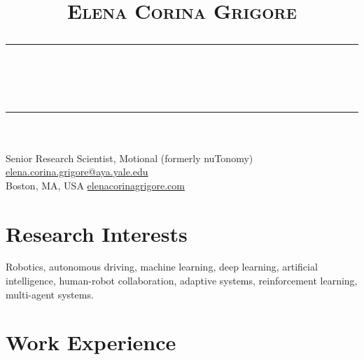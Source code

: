 \documentclass[10pt,letterpaper]{article}
\title{\vspace{-5em}
	\Huge{\textsc{Elena Corina Grigore}}
	\vspace{-0.7em}
	\\\noindent\rule{\linewidth}{0.5pt}
	\vspace{-2.5em}
	\\\noindent\rule{\linewidth}{0.5pt}
	\vspace{-3.2em}
}
\date{}
\begin{document}
\maketitle
\thispagestyle{fancy}



Senior Research Scientist, Motional (formerly nuTonomy) \hfill \href{mailto:elena.corina.grigore@aya.yale.edu}{elena.corina.grigore@aya.yale.edu}\\
Boston, MA, USA \hfill \href{http://elenacorinagrigore.com}{elenacorinagrigore.com}

\vspace{-0.6em}
\section{Research Interests}
\vspace{-0.5em}
Robotics, autonomous driving, machine learning, deep learning, artificial intelligence, human-robot collaboration, adaptive systems, reinforcement learning, multi-agent systems.

\vspace{-0.5em}
\section{Work Experience}
\end{document}
